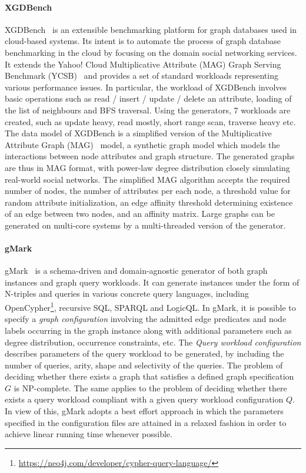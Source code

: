 \paragraph{XGDBench} XGDBench~\cite{Dayarathna:2014:GDB:2676904.2676939} is an extensible  benchmarking platform for graph databases used in cloud-based systems. Its intent is to automate
the process of graph database benchmarking in the cloud by focusing on the domain social networking services. It extends the Yahoo! Cloud Multiplicative Attribute (MAG) Graph Serving Benchmark (YCSB)~\cite{Cooper:2010:BCS:1807128.1807152} and provides a set of standard workloads representing various performance issues. In particular, the workload of XGDBench involves basic operations such as read / insert / update / delete an attribute, loading of the list of neighbours and BFS traversal. Using the generators, 7 workloads are created, such as update heavy, read mostly, short range scan, traverse heavy etc.
The data model of XGDBench is a simplified version of the Multiplicative Attribute Graph (MAG)~\cite{Kim2010} model, a synthetic graph model which models the interactions between node attributes and  graph structure.
The generated graphs are thus in MAG format, with power-law degree distribution closely simulating real-world social networks.
The simplified MAG algorithm accepts the required number of nodes, the number of attributes per each node, a threshold value for random attribute initialization, an edge affinity threshold determining existence of an edge between two nodes, and an affinity matrix. \iffalse It has been proven that MAG generates graphs with both analytically tractable and statistically interesting properties.\fi
Large graphs can be generated on multi-core systems by a multi-threaded version of the  generator.


\paragraph{gMark}  gMark~\cite{gMark} is a schema-driven and domain-agnostic generator of both graph instances and graph query workloads. It can generate instances under the form of N-triples and queries in various concrete query languages, including OpenCypher\footnote{\url{https://neo4j.com/developer/cypher-query-language/}}, recursive SQL, SPARQL and LogicQL. In gMark, it is possible to specify a \emph{graph configuration} involving the admitted edge predicates and node labels occurring in the graph instance along with additional parameters such as degree distribution, occurrence constraints, etc. The \emph{Query workload configuration} describes parameters of the query workload to be generated, by including the number of queries, arity, shape and selectivity of the queries.
The problem of deciding whether there exists a graph that satisfies a defined graph specification $G$ is NP-complete. The same applies to the problem of deciding
whether there exists a query workload compliant with a given query workload configuration $Q$. In view of this, gMark adopts a best effort approach in which the
parameters specified in the configuration files are attained in a relaxed fashion in order to achieve linear running time whenever possible.

